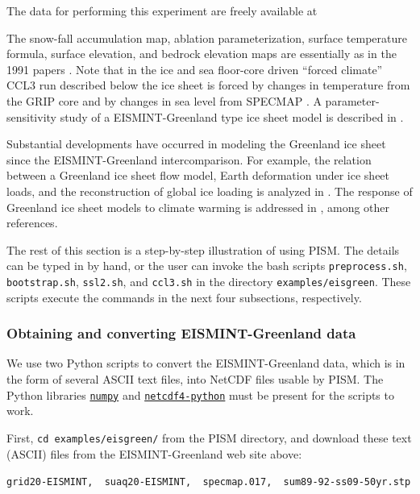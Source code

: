 \documentclass[11pt,final]{amsart}
\begin{document}
The data for performing this experiment are freely available at
\medskip

\centerline{}
\medskip

\noindent The snow-fall accumulation map, ablation parameterization, surface temperature formula, surface elevation, and bedrock elevation maps are essentially as in the 1991 papers \cite{Letreguillyetal1991,OhmuraReeh}.  Note that in the ice and sea floor-core driven ``forced climate'' CCL3 run described below the ice sheet is forced by changes in temperature from the GRIP core \cite{Dansgaardetal1993} and by changes in sea level from SPECMAP \cite{Imbrieetal1984}.  A parameter-sensitivity study of a EISMINT-Greenland type ice sheet model is described in \cite{RitzFabreLetreguilly}.

Substantial developments have occurred in modeling the Greenland ice sheet since the EISMINT-Greenland intercomparison.  For example, the relation between a Greenland ice sheet flow model, Earth deformation under ice sheet loads, and the reconstruction of global ice loading is analyzed in \cite{TarasovPeltier}.  The response of Greenland ice sheet models to climate warming is addressed in \cite{HuybrechtsdeWolde,Huybrechts02, Greve00}, among other references.

The rest of this section is a step-by-step illustration of using PISM.  The details can be typed in by hand, or the user can invoke the bash scripts \verb|preprocess.sh|, \verb|bootstrap.sh|, \verb|ssl2.sh|, and \verb|ccl3.sh| in the directory \verb|examples/eisgreen|.  These scripts execute the commands in the next four subsections, respectively.

\subsubsection*{Obtaining and converting EISMINT-Greenland data}  We use two Python scripts to convert the EISMINT-Greenland data, which is in the form of several ASCII text files, into NetCDF files usable by PISM.  The Python libraries \href{http://numpy.scipy.org/}{\texttt{numpy}} and \href{http://code.google.com/p/netcdf4-python/}{\texttt{netcdf4-python}} must be present for the scripts to work.

First, \verb|cd examples/eisgreen/| from the PISM directory, and download these text (ASCII) files from the EISMINT-Greenland web site above: 

\verb|grid20-EISMINT,  suaq20-EISMINT,  specmap.017,  sum89-92-ss09-50yr.stp|
\end{document}
